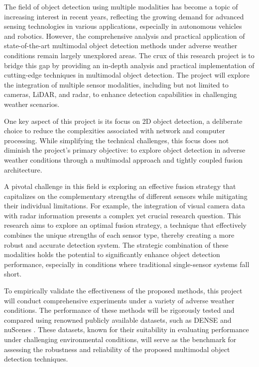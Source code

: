 \documentclass[report.tex]{subfiles}
\begin{document}

    The field of object detection using multiple modalities has become a topic of increasing interest in recent years, reflecting the growing demand for advanced sensing technologies in various applications, especially in autonomous vehicles and robotics. However, the comprehensive analysis and practical application of state-of-the-art multimodal object detection methods under adverse weather conditions remain largely unexplored areas. The crux of this research project is to bridge this gap by providing an in-depth analysis and practical implementation of cutting-edge techniques in multimodal object detection. The project will explore the integration of multiple sensor modalities, including but not limited to cameras, LiDAR, and radar, to enhance detection capabilities in challenging weather scenarios.

    One key aspect of this project is its focus on 2D object detection, a deliberate choice to reduce the complexities associated with network and computer processing. While simplifying the technical challenges, this focus does not diminish the project's primary objective: to explore object detection in adverse weather conditions through a multimodal approach and tightly coupled fusion architecture.
    
    A pivotal challenge in this field is exploring an effective fusion strategy that capitalizes on the complementary strengths of different sensors while mitigating their individual limitations. For example, the integration of visual camera data with radar information presents a complex yet crucial research question. This research aims to explore an optimal fusion strategy, a technique that effectively combines the unique strengths of each sensor type, thereby creating a more robust and accurate detection system. The strategic combination of these modalities holds the potential to significantly enhance object detection performance, especially in conditions where traditional single-sensor systems fall short.

    To empirically validate the effectiveness of the proposed methods, this project will conduct comprehensive experiments under a variety of adverse weather conditions. The performance of these methods will be rigorously tested and compared using renowned publicly available datasets, such as DENSE \cite{bijelic2020seeing} and nuScenes \cite{caesar2020nuscenes}. These datasets, known for their suitability in evaluating performance under challenging environmental conditions, will serve as the benchmark for assessing the robustness and reliability of the proposed multimodal object detection techniques.
\end{document}
